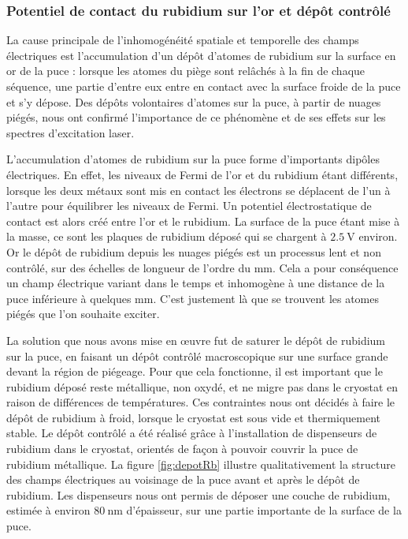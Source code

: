 \subsubsection*{Potentiel de contact du rubidium sur l'or et dépôt contrôlé}
\noindent La cause principale de l'inhomogénéité spatiale et temporelle des champs électriques est l'accumulation d'un dépôt d'atomes de rubidium sur la surface en or de la puce :
lorsque les atomes du piège sont relâchés à la fin de chaque séquence, une partie d'entre eux entre en contact avec la surface froide de la puce et s'y dépose.
Des dépôts volontaires d'atomes sur la puce, à partir de nuages piégés, nous ont confirmé l'importance de ce phénomène et de ses effets sur les spectres d'excitation laser.

L'accumulation d'atomes de rubidium sur la puce forme d'importants dipôles électriques.
En effet, les niveaux de Fermi de l'or et du rubidium étant différents, lorsque les deux métaux sont mis en contact les électrons se déplacent de l'un à l'autre pour équilibrer les niveaux de Fermi.
Un potentiel électrostatique de contact est alors créé entre l'or et le rubidium.
La surface de la puce étant mise à la masse, ce sont les plaques de rubidium déposé qui se chargent à $\SI{2.5}{\V}$ environ.
Or le dépôt de rubidium depuis les nuages piégés est un processus lent et non contrôlé, sur des échelles de longueur de l'ordre du $\si{\mm}$.
Cela a pour conséquence un champ électrique variant dans le temps et inhomogène à une distance de la puce inférieure à quelques $\si{\mm}$.
C'est justement là que se trouvent les atomes piégés que l'on souhaite exciter.

La solution que nous avons mise en \oe uvre fut de saturer le dépôt de rubidium sur la puce, en faisant un dépôt contrôlé macroscopique sur une surface grande devant la région de piégeage.
Pour que cela fonctionne, il est important que le rubidium déposé reste métallique, non oxydé, et ne migre pas dans le cryostat en raison de différences de températures.
Ces contraintes nous ont décidés à faire le dépôt de rubidium à froid, lorsque le cryostat est sous vide et thermiquement stable.
Le dépôt contrôlé a été réalisé grâce à l'installation de dispenseurs de rubidium dans le cryostat, orientés de façon à pouvoir couvrir la puce de rubidium métallique.
La figure \eqref{fig:depotRb} illustre qualitativement la structure des champs électriques au voisinage de la puce avant et après le dépôt de rubidium.
Les dispenseurs nous ont permis de déposer une couche de rubidium, estimée à environ $\SI{80}{\nano\meter}$ d'épaisseur, sur une partie importante de la surface de la puce.

